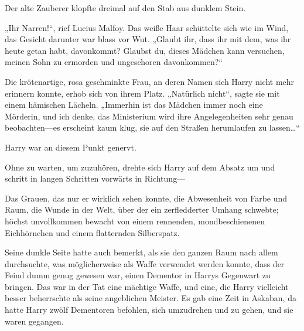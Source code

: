 Der alte Zauberer klopfte dreimal auf den Stab aus dunklem Stein.

„Ihr Narren!“, rief Lucius Malfoy.
Das weiße Haar schüttelte sich wie im Wind, das Gesicht darunter war blass vor Wut.
„Glaubt ihr, dass ihr mit dem, was ihr heute getan habt, davonkommt? Glaubst du, dieses Mädchen kann versuchen, meinen Sohn zu ermorden und ungeschoren davonkommen?“

Die krötenartige, rosa geschminkte Frau, an deren Namen sich Harry nicht mehr erinnern konnte, erhob sich von ihrem Platz.
„Natürlich nicht“, sagte sie mit einem hämischen Lächeln.
„Immerhin ist das Mädchen immer noch eine Mörderin, und ich denke, das Ministerium wird ihre Angelegenheiten sehr genau beobachten—es erscheint kaum klug, sie auf den Straßen herumlaufen zu lassen…“

Harry war an diesem Punkt genervt.

Ohne zu warten, um zuzuhören, drehte sich Harry auf dem Absatz um und schritt in langen Schritten vorwärts in Richtung—

Das Grauen, das nur er wirklich sehen konnte, die Abwesenheit von Farbe und Raum, die Wunde in der Welt, über der ein zerfledderter Umhang schwebte; höchst unvollkommen bewacht von einem rennenden, mondbeschienenen Eichhörnchen und einem flatternden Silberspatz.

Seine dunkle Seite hatte auch bemerkt, als sie den ganzen Raum nach allem durchsuchte, was möglicherweise als Waffe verwendet werden konnte, dass der Feind dumm genug gewesen war, einen Dementor in Harrys Gegenwart zu bringen. Das war in der Tat eine mächtige Waffe, und eine, die Harry vielleicht besser beherrschte als seine angeblichen Meister. Es gab eine Zeit in Askaban, da hatte Harry zwölf Dementoren befohlen, sich umzudrehen und zu gehen, und sie waren gegangen.

